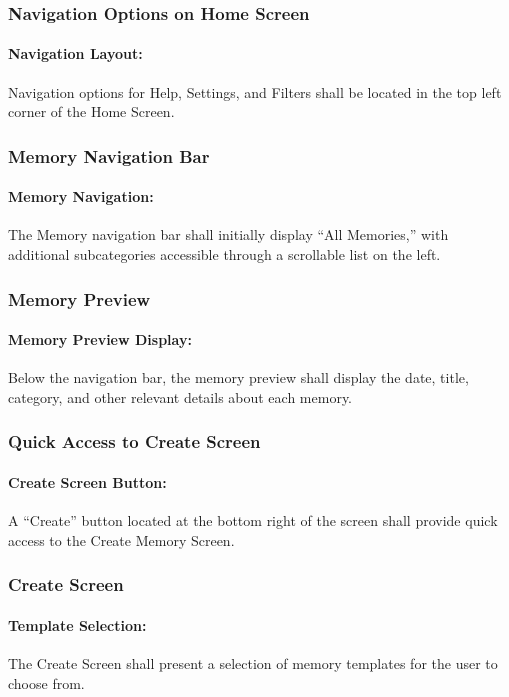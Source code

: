 \documentclass{article}
\begin{document}
\subsubsection*{Navigation Options on Home Screen}
\addtocounter{subsubsection}{1}
\paragraph{Navigation Layout:} Navigation options for Help, Settings, and Filters shall be located in the top left corner of the Home Screen.
\subsubsection*{Memory Navigation Bar}
\addtocounter{subsubsection}{1}
\paragraph{Memory Navigation:} The Memory navigation bar shall initially display “All Memories,” with additional subcategories accessible through a scrollable list on the left.
\subsubsection*{Memory Preview}
\addtocounter{subsubsection}{1}
\paragraph{Memory Preview Display:} Below the navigation bar, the memory preview shall display the date, title, category, and other relevant details about each memory.
\subsubsection*{Quick Access to Create Screen}
\addtocounter{subsubsection}{1}
\paragraph{Create Screen Button:} A “Create” button located at the bottom right of the screen shall provide quick access to the Create Memory Screen.
\subsubsection*{Create Screen}
\addtocounter{subsubsection}{1}
\paragraph{Template Selection:} The Create Screen shall present a selection of memory templates for the user to choose from.
\end{document}

